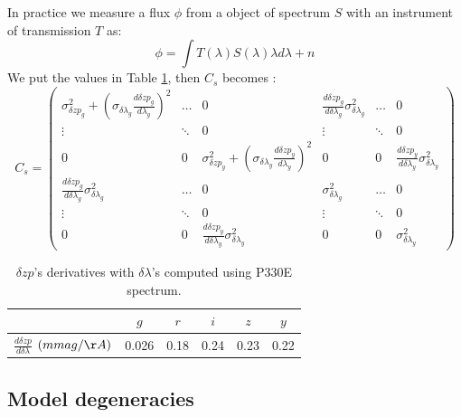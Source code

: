 \documentclass[\docopts]{\docclass}
\begin{document}
In practice we measure a flux $\phi$ from a object of spectrum $S$ with an instrument of transmission $T$ as:
\begin{equation}
\phi = \int T(\lambda) S(\lambda) \lambda d\lambda + n
\end{equation}
We put the values in Table \ref{tab::calib_derivatives}, then $C_s$ becomes :
\begin{equation}
\label{eq::cov_calib}
C_s = 
\begin{pmatrix}
  \sigma^2_{\delta zp_{g}} + (\sigma_{\delta\lambda_g} \frac{d\delta zp_g}{d\lambda_g})^2 & \ldots & 0 & \frac{d \delta zp_g}{d \delta \lambda_g} \sigma^2_{\delta \lambda_g} & \ldots & 0 \\
   \vdots & \ddots & 0 & \vdots & \ddots & 0 \\
   0 & 0 & \sigma^2_{\delta zp_{y}} + (\sigma_{\delta\lambda_y} \frac{d\delta zp_y}{d\lambda_y})^2 & 0 & 0 & \frac{d \delta zp_y}{d \delta \lambda_y} \sigma^2_{\delta \lambda_y} \\
   \frac{d \delta zp_g}{d \delta \lambda_g} \sigma^2_{\delta \lambda_g} & \ldots & 0 & \sigma^2_{\delta\lambda_{g}} & \ldots & 0 \\
   \vdots & \ddots & 0 & \vdots & \ddots & 0 \\
   0 & 0 & \frac{d \delta zp_y}{d \delta \lambda_y} \sigma^2_{\delta \lambda_y} & 0 & 0 & \sigma^2_{\delta\lambda_{y}}
\end{pmatrix}
\end{equation}

\begin{table}[t]
\begin{center}
\caption{$\delta zp$'s derivatives with $\delta\lambda$'s computed using P330E spectrum.}
\label{tab::calib_derivatives}
\begin{tabular}{l|ccccc}
\hline
\hline
  & $g$ & $r$ & $i$ & $z$ & $y$ \\
\hline 
  $\frac{d \delta zp}{d \delta \lambda}$ $(mmag/\AA)$& 0.026 & 0.18 & 0.24 & 0.23 & 0.22\\
\hline
\end{tabular}
\end{center}
\end{table}


\subsection{Model degeneracies}
\label{sec::model_deg}
\end{document}
